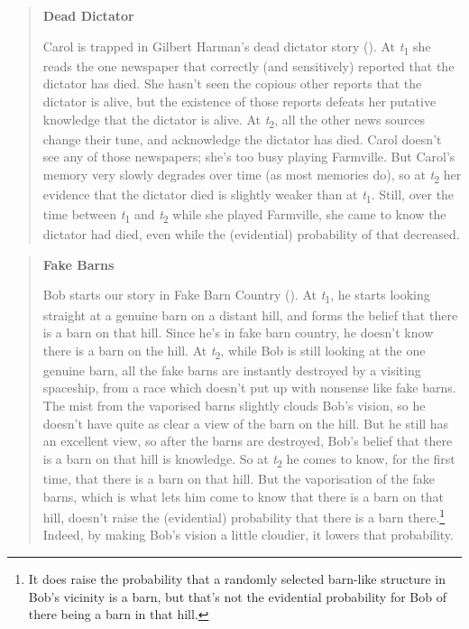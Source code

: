 \documentclass[
  10pt,
  letterpaper,
  DIV=11,
  numbers=noendperiod,
  twoside]{scrartcl}
\begin{document}
\begin{quote}
\textbf{Dead Dictator}

Carol is trapped in Gilbert Harman's dead dictator story
(). At
\emph{t}\textsubscript{1} she reads the one newspaper that correctly
(and sensitively) reported that the dictator has died. She hasn't seen
the copious other reports that the dictator is alive, but the existence
of those reports defeats her putative knowledge that the dictator is
alive. At \emph{t}\textsubscript{2}, all the other news sources change
their tune, and acknowledge the dictator has died. Carol doesn't see any
of those newspapers; she's too busy playing Farmville. But Carol's
memory very slowly degrades over time (as most memories do), so at
\emph{t}\textsubscript{2} her evidence that the dictator died is
slightly weaker than at \emph{t}\textsubscript{1}. Still, over the time
between \emph{t}\textsubscript{1} and \emph{t}\textsubscript{2} while
she played Farmville, she came to know the dictator had died, even while
the (evidential) probability of that decreased.
\end{quote}

\begin{quote}
\textbf{Fake Barns}

Bob starts our story in Fake Barn Country
(). At
\emph{t}\textsubscript{1}, he starts looking straight at a genuine barn
on a distant hill, and forms the belief that there is a barn on that
hill. Since he's in fake barn country, he doesn't know there is a barn
on the hill. At \emph{t}\textsubscript{2}, while Bob is still looking at
the one genuine barn, all the fake barns are instantly destroyed by a
visiting spaceship, from a race which doesn't put up with nonsense like
fake barns. The mist from the vaporised barns slightly clouds Bob's
vision, so he doesn't have quite as clear a view of the barn on the
hill. But he still has an excellent view, so after the barns are
destroyed, Bob's belief that there is a barn on that hill is knowledge.
So at \emph{t}\textsubscript{2} he comes to know, for the first time,
that there is a barn on that hill. But the vaporisation of the fake
barns, which is what lets him come to know that there is a barn on that
hill, doesn't raise the (evidential) probability that there is a barn
there.\footnote{It does raise the probability that a randomly selected
  barn-like structure in Bob's vicinity is a barn, but that's not the
  evidential probability for Bob of there being a barn in that hill.}
Indeed, by making Bob's vision a little cloudier, it lowers that
probability.
\end{quote}
\end{document}
